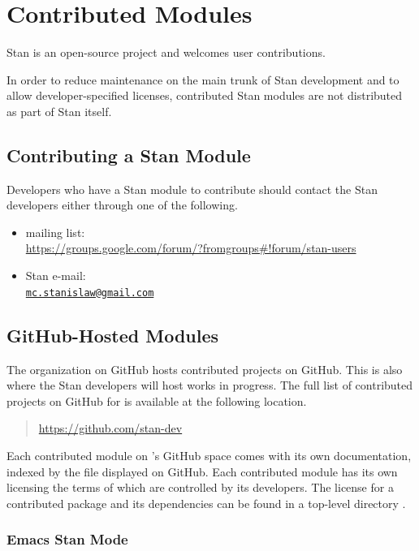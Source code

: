 \chapter{Contributed Modules}

\noindent
Stan is an open-source project and welcomes user contributions.  

In order to reduce maintenance on the main trunk of Stan development
and to allow developer-specified licenses, contributed Stan modules
are not distributed as part of Stan itself.


\section{Contributing a Stan Module}

Developers who have a Stan module to contribute should contact the
Stan developers either through one of the following.
%
\begin{itemize}
\item {} mailing list: 
\\
\url{https://groups.google.com/forum/?fromgroups#!forum/stan-users}
\item Stan e-mail: 
\\
\href{mailto:mc.stanislaw@gmail.com}{\tt mc.stanislaw@gmail.com}
\end{itemize}


\section{GitHub-Hosted Modules}

The  organization on GitHub hosts contributed projects
on GitHub.  This is also where the Stan developers will host works in
progress.  The full list of contributed projects on GitHub for
 is available at the following location.
%
\begin{quote}
\url{https://github.com/stan-dev}
\end{quote}

Each contributed module on 's GitHub space comes with
its own documentation, indexed by the  file displayed
on GitHub.  Each contributed module has its own licensing the terms of
which are controlled by its developers.  The license for a contributed
package and its dependencies can be found in a top-level directory
.

\subsection{Emacs Stan Mode}


